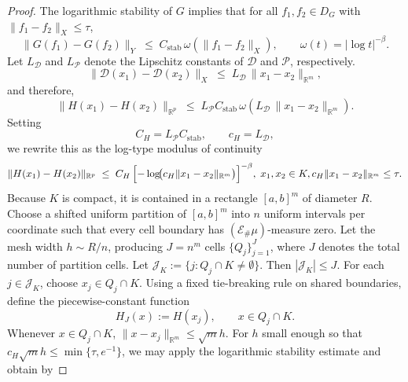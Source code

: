 \documentclass{article}
\numberwithin{equation}{section}
\theoremstyle{plain}
\begin{document}
	\begin{proof}
		The logarithmic stability of $G$ implies that for all $f_1,f_2\in D_G$ with $\|f_1-f_2\|_X\le \tau$,
		\begin{equation*}
			\|G(f_1)-G(f_2)\|_Y
			\;\le\;
			C_{\mathrm{stab}}\,
			\omega\!\left(
			\|f_1-f_2\|_X
			\right),
			\qquad 
			\omega(t)=|\log t|^{-\beta}.
		\end{equation*}
		Let \(L_{\mathcal D}\) and \(L_{\mathcal P}\) denote the Lipschitz constants of \(\mathcal D\) and \(\mathcal P\), respectively.
		\begin{equation*}
			\|\mathcal D(x_1)-\mathcal D(x_2)\|_X
			\;\le\;
			L_\mathcal D\,\|x_1-x_2\|_{\mathbb R^{m}},
		\end{equation*}
		and therefore,
		\begin{equation*}
			\|H(x_1)-H(x_2)\|_{\mathbb R^{p}}
			\;\le\;
			L_\mathcal P C_{\mathrm{stab}}\,
			\omega\!\left(L_\mathcal D\,\|x_1-x_2\|_{\mathbb R^{m}}\right).
		\end{equation*}
		Setting 
		\begin{equation*}
			C_H = L_\mathcal P C_{\mathrm{stab}}, \qquad c_H = L_\mathcal D,
		\end{equation*}
		we rewrite this as the log-type modulus of continuity
		\begin{equation}\label{eq:log-modulus-final}
			\|H(x_1)-H(x_2)\|_{\mathbb R^{p}}
			\;\le\;
			C_H\,
			\Bigl[-\log\!\bigl(c_H\|x_1-x_2\|_{\mathbb R^{m}}\bigr)\Bigr]^{-\beta},
			\; x_1,x_2\in K ,
			c_H\|x_1-x_2\|_{\mathbb R^m}\le \tau.
		\end{equation}
		Because $K$ is compact, it is contained in a rectangle $[a,b]^m$ of diameter $R$.
		Choose a shifted uniform partition of $[a,b]^m$ into $n$ uniform intervals per coordinate such that every cell boundary has $(\mathcal E_\#\mu)$-measure zero. Let the mesh width
		$h\sim R/n$, producing $J=n^{m}$ cells $\{Q_j\}_{j=1}^{J}$, where $J$ denotes the total number of partition cells.  
		Let $\mathcal J_K:=\{j:Q_j\cap K\neq\emptyset\}$. Then
		$|\mathcal J_K|\le J$. For each $j\in\mathcal J_K$, choose
		$x_j\in Q_j\cap K$. Using a fixed tie-breaking rule on shared boundaries, define the piecewise-constant function
		\begin{equation*}
			H_J(x) := H(x_j), \qquad x\in Q_j\cap K.
		\end{equation*}
		Whenever $x\in Q_j\cap K$, $\|x-x_j\|_{\mathbb R^{m}}\le \sqrt{m} h$. For $h$ small enough so that $c_H \sqrt{m} h\le \min\{\tau,e^{-1}\}$, we may apply the logarithmic stability estimate and obtain by 

\end{proof}
\end{document}
